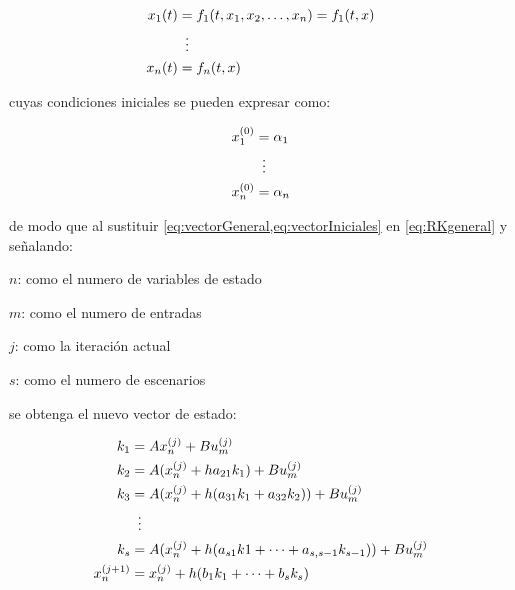             
            \begin{equation}\label{eq:vectorGeneral}
                \begin{aligned}
                    x_1(t) &= f_1(t, x_1, x_2, \dots, x_n) = f_1(t,x)\\
                    &\mathrel{\makebox[\widthof{=}]{\vdots}}\\
                    x_n(t) &=  f_n(t,x)
                \end{aligned}
            \end{equation}

            \noindent cuyas condiciones iniciales se pueden expresar como:

            \begin{equation}\label{eq:vectorIniciales}
                \begin{aligned}
                    x_1^{(0)} &= \alpha_1\\
                    &\mathrel{\makebox[\widthof{=}]{\vdots}}\\
                    x_n^{(0)} &=  \alpha_n
                \end{aligned}
            \end{equation}
            
            \noindent de modo que al sustituir \cref{eq:vectorGeneral,eq:vectorIniciales} en \cref{eq:RKgeneral} y señalando:

            \vfill 

            \begin{spacing}{1.5}
				
				$n$: como el numero de variables de estado
				
				$m$: como el numero de entradas
				
				$j$: como la iteración actual
                
                $s$: como el numero de escenarios
            \end{spacing}

            \vfill
            \pagebreak

            \noindent se obtenga el nuevo vector de estado:

            \begin{equation}\label{eq:RKstate}
                \begin{aligned}
                    k_1 &= Ax_n^{(j)} + Bu_m^{(j)}\\
                    k_2 &= A(x_n^{(j)} +  ha_{21}k_1) + Bu_m^{(j)}\\
                    k_3 &= A(x_n^{(j)} +  h(a_{31}k_1 + a_{32}k_2)) + Bu_m^{(j)}\\
                    &\mathrel{\makebox[\widthof{=}]{\vdots}}\\
                    k_s &= A(x_n^{(j)} + h(a_{s1}k1 + \cdots +  a_{s,s-1}k_{s-1})) + Bu_m^{(j)}\\
                    x_n^{(j+1)} &= x_n^{(j)} + h(b_1 k_1 + \cdots + b_s k_s)
                \end{aligned}
            \end{equation}
            
